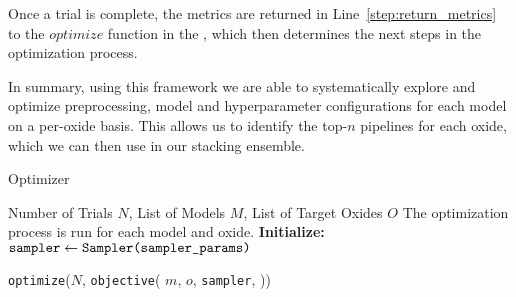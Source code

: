 Once a trial is complete, the metrics are returned in Line~\ref{step:return_metrics} to the $optimize$ function in the , which then determines the next steps in the optimization process.

In summary, using this framework we are able to systematically explore and optimize preprocessing, model and hyperparameter configurations for each model on a per-oxide basis.
This allows us to identify the top-$n$ pipelines for each oxide, which we can then use in our stacking ensemble. 

\begin{algorithm}
\caption{Optimizer}
\label{alg:study_function}
\begin{algorithmic}[1]
\Require Number of Trials $N$, List of Models $M$, List of Target Oxides $O$ \label{step:initialize_run_process}
\Ensure The optimization process is run for each model and oxide. 
\State \textbf{Initialize:} $\texttt{sampler} \gets \texttt{Sampler(\texttt{sampler\_params})}$ \label{step:initialize_sampler}

 \label{step:oxide_loop}
     \label{step:model_loop}
        \State \texttt{optimize}($N$, \texttt{objective}( \label{step:optimize_objective}
        \State \hspace{1.5em} $m$, \label{step:model_param_study}
        \State \hspace{1.5em} $o$, \label{step:oxide_param_study}
        \State \hspace{1.5em} \texttt{sampler}, \label{step:sampler_param_study}
        \State )) \label{step:optimize_combined_objective}
    \EndFor
\EndFor
\end{algorithmic}
\end{algorithm}

